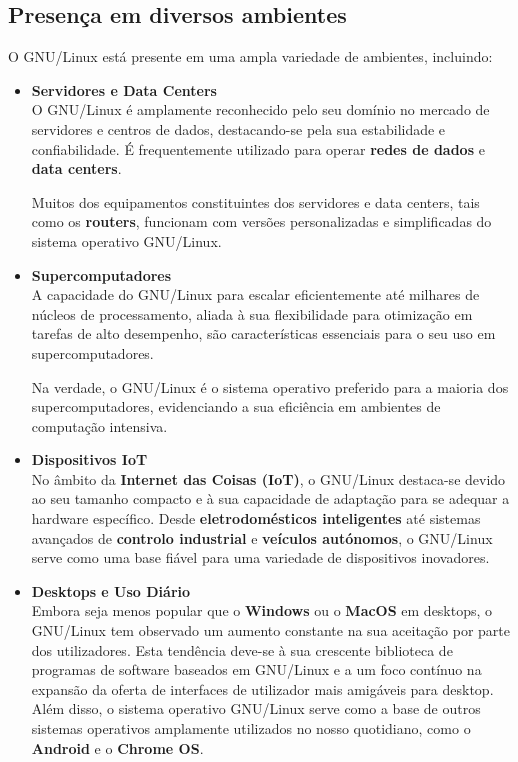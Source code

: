 \subsection{Presença em diversos ambientes}
O GNU/Linux está presente em uma ampla variedade de ambientes, incluindo: \cite{diverseUsage}
\begin{itemize}

    \item \textbf{Servidores e Data Centers}\\
    O GNU/Linux é amplamente reconhecido pelo seu domínio no mercado de servidores e centros de dados, destacando-se pela sua estabilidade e confiabilidade. É frequentemente utilizado para operar \textbf{redes de dados} e \textbf{data centers}.

    Muitos dos equipamentos constituintes dos servidores e data centers, tais como os \textbf{routers}, funcionam com versões personalizadas e simplificadas do sistema operativo GNU/Linux.
    

    \item \textbf{Supercomputadores}\\
    A capacidade do GNU/Linux para escalar eficientemente até milhares de núcleos de processamento, aliada à sua flexibilidade para otimização em tarefas de alto desempenho, são características essenciais para o seu uso em supercomputadores. 
    
    Na verdade, o GNU/Linux é o sistema operativo preferido para a maioria dos supercomputadores, evidenciando a sua eficiência em ambientes de computação intensiva.
    

    \item \textbf{Dispositivos IoT}\\
    No âmbito da \textbf{Internet das Coisas (IoT)}, o GNU/Linux destaca-se devido ao seu tamanho compacto e à sua capacidade de adaptação para se adequar a hardware específico. Desde \textbf{eletrodomésticos inteligentes} até sistemas avançados de \textbf{controlo industrial} e \textbf{veículos autónomos}, o GNU/Linux serve como uma base fiável para uma variedade de dispositivos inovadores.
    

    \item \textbf{Desktops e Uso Diário}\\
    Embora seja menos popular que o \textbf{Windows} ou o \textbf{MacOS} em desktops, o GNU/Linux tem observado um aumento constante na sua aceitação por parte dos utilizadores. Esta tendência deve-se à sua crescente biblioteca de programas de software baseados em GNU/Linux e a um foco contínuo na expansão da oferta de interfaces de utilizador mais amigáveis para desktop. Além disso, o sistema operativo GNU/Linux serve como a base de outros sistemas operativos amplamente utilizados no nosso quotidiano, como o \textbf{Android} e o \textbf{Chrome OS}.
    


\end{itemize}
